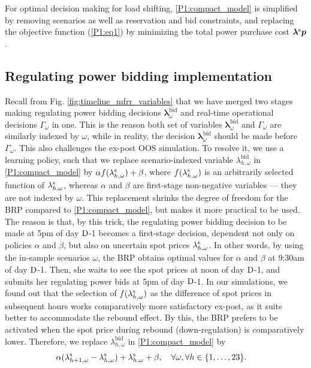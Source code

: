 For optimal decision making for load shifting, \eqref{P1:compact_model} is simplified by removing scenarios as well as reservation and bid constraints, and replacing the objective function (\ref{P1:eq1}) by minimizing the total power purchase cost $\bm{\lambda}^{\rm{s}} \bm{p}$.

\vspace{-1mm}
\subsection{Regulating power bidding implementation}\label{sec:mFRR_bidding_implementation}
Recall from  Fig. \ref{fig:timeline_mfrr_variables} that we have merged two stages making regulating power bidding decisions $\bm{\lambda}_{\omega}^{\text{bid}}$ and real-time operational decisions $\Gamma_{\omega}$ in one. This is the reason both set of variables $\bm{\lambda}_{\omega}^{\text{bid}}$ and $\Gamma_{\omega}$ are similarly indexed by $\omega$, while in reality, the decision $\bm{\lambda}_{\omega}^{\text{bid}}$ should be made before $\Gamma_{\omega}$. This also challenges the ex-post OOS simulation. To resolve it, we use a learning policy, such that we replace scenario-indexed variable $\lambda_{h,\omega}^{\text{bid}}$ in \eqref{P1:compact_model} by $\alpha f(\lambda_{h,\omega}^{\rm{s}}) + \beta$, where $f(\lambda_{h,\omega}^{\rm{s}})$ is an arbitrarily selected function of $\lambda_{h,\omega}^{\rm{s}}$, whereas $\alpha$ and $\beta$ are first-stage non-negative variables --- they are not indexed by $\omega$. This replacement shrinks the degree of freedom for the BRP compared to \eqref{P1:compact_model}, but makes it more practical to be used. The reason is that, by this trick, the regulating power bidding decision to be made at 5pm of day $\rm{D}$-1 becomes a first-stage decision, dependent not only on policies $\alpha$ and $\beta$, but also on uncertain spot prices $\lambda_{h,\omega}^{\rm{s}}$. In other words, by using the in-sample scenarios $\omega$, the BRP obtains optimal values for $\alpha$ and $\beta$ at 9:30am of day $\rm{D}$-1. Then, she waits to see the spot prices at noon of day $\rm{D}$-1, and  submits her regulating power bids at 5pm of day $\rm{D}$-1. In our simulations, we found out that the selection of $f(\lambda_{h,\omega}^{\rm{s}})$ as the difference of spot prices in subsequent hours works comparatively more satisfactory ex-post, as it suits better to accommodate the rebound effect. By this, the BRP prefers to be activated when the spot price during rebound (down-regulation) is comparatively lower. Therefore, we replace $\lambda_{h,\omega}^{\text{bid}}$ in \eqref{P1:compact_model} by 
%
\begin{align}\label{eq:affine_policy}
     & \alpha ( \lambda_{h+1,\omega}^{\rm{s}} - \lambda_{h,\omega}^{\rm{s}}) + \lambda_{h,\omega}^{\rm{s}} + \beta, \quad \forall{\omega}, \forall{h} \in \{1, \ldots, 23\}.
\end{align}



